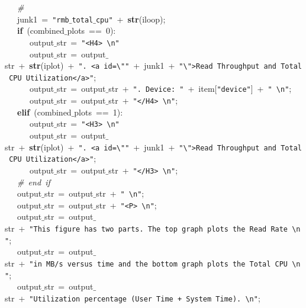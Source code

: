 \mbox{}\ \ \ \textit{\#} \\
\mbox{}\ \ \ junk1\ =\ \texttt{"{}rmb$\_$total$\_$cpu"{}}\ +\ \textbf{str}(iloop); \\
\mbox{}\ \ \ \textbf{if}\ (combined$\_$plots\ ==\ 0): \\
\mbox{}\ \ \ \ \ \ output$\_$str\ =\ \texttt{"{}\textless{}H4\textgreater{}\ \textbackslash{}n"{}} \\
\mbox{}\ \ \ \ \ \ output$\_$str\ =\ output$\_$str\ +\ \textbf{str}(iplot)\ +\ \texttt{"{}.\ \textless{}a\ id=\textbackslash{}"{}"{}}\ +\ junk1\ +\ \texttt{"{}\textbackslash{}"{}\textgreater{}Read\ Throughput\ and\ Total\ CPU\ Utilization\textless{}/a\textgreater{}"{}}; \\
\mbox{}\ \ \ \ \ \ output$\_$str\ =\ output$\_$str\ +\ \texttt{"{}.\ Device:\ "{}}\ +\ item[\texttt{"{}device"{}}]\ +\ \texttt{"{}\ \textbackslash{}n"{}}; \\
\mbox{}\ \ \ \ \ \ output$\_$str\ =\ output$\_$str\ +\ \texttt{"{}\textless{}/H4\textgreater{}\ \textbackslash{}n"{}}; \\
\mbox{}\ \ \ \textbf{elif}\ (combined$\_$plots\ ==\ 1): \\
\mbox{}\ \ \ \ \ \ output$\_$str\ =\ \texttt{"{}\textless{}H3\textgreater{}\ \textbackslash{}n"{}} \\
\mbox{}\ \ \ \ \ \ output$\_$str\ =\ output$\_$str\ +\ \textbf{str}(iplot)\ +\ \texttt{"{}.\ \textless{}a\ id=\textbackslash{}"{}"{}}\ +\ junk1\ +\ \texttt{"{}\textbackslash{}"{}\textgreater{}Read\ Throughput\ and\ Total\ CPU\ Utilization\textless{}/a\textgreater{}"{}}; \\
\mbox{}\ \ \ \ \ \ output$\_$str\ =\ output$\_$str\ +\ \texttt{"{}\textless{}/H3\textgreater{}\ \textbackslash{}n"{}}; \\
\mbox{}\ \ \ \textit{\#\ end\ if} \\
\mbox{}\ \ \ output$\_$str\ =\ output$\_$str\ +\ \texttt{"{}\ \textbackslash{}n"{}}; \\
\mbox{}\ \ \ output$\_$str\ =\ output$\_$str\ +\ \texttt{"{}\textless{}P\textgreater{}\ \textbackslash{}n"{}}; \\
\mbox{}\ \ \ output$\_$str\ =\ output$\_$str\ +\ \texttt{"{}This\ figure\ has\ two\ parts.\ The\ top\ graph\ plots\ the\ Read\ Rate\ \textbackslash{}n"{}}; \\
\mbox{}\ \ \ output$\_$str\ =\ output$\_$str\ +\ \texttt{"{}in\ MB/s\ versus\ time\ and\ the\ bottom\ graph\ plots\ the\ Total\ CPU\ \textbackslash{}n"{}}; \\
\mbox{}\ \ \ output$\_$str\ =\ output$\_$str\ +\ \texttt{"{}Utilization\ percentage\ (User\ Time\ +\ System\ Time).\ \textbackslash{}n"{}}; \\
